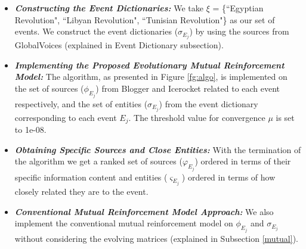 \begin{itemize}
\item \textit{\textbf{Constructing the Event Dictionaries:}} We take $\xi$ = \{``Egyptian Revolution", ``Libyan Revolution", ``Tunisian Revolution"\} as our set of events. We construct the event dictionaries ($\sigma_{E_{j}}$) by using the sources from GlobalVoices (explained in Event Dictionary subsection). 



\item \textit{\textbf{Implementing the Proposed Evolutionary Mutual Reinforcement Model:}} The algorithm, as presented in Figure \ref{fg:algo}, is implemented on the set of sources ($\phi_{E_{j}}$) from Blogger and Icerocket related to each event respectively, and the set of entities ($\sigma_{E_{j}}$) from the event dictionary corresponding to each event $E_{j}$. The threshold value for convergence $\mu$ is set to 1e-08.

%

\item \textit{\textbf{Obtaining Specific Sources and Close Entities:}} With the termination of the algorithm we get a ranked set of sources ($\varphi_{E_{j}}$) ordered in terms of their specific information content and entities ($\varsigma_{E_{j}}$) ordered in terms of how closely related they are to the event. 

\item \textit{\textbf{Conventional Mutual Reinforcement Model Approach:}} We also implement the conventional mutual reinforcement model on $\phi_{E_{j}}$ and $\sigma_{E_{j}}$ without considering the evolving matrices (explained in Subsection \ref{mutual}).

\end{itemize}



